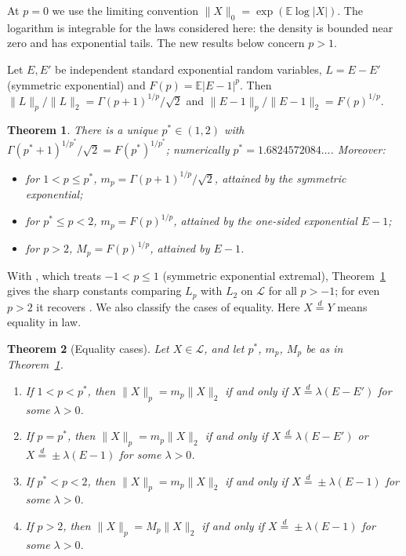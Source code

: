 \documentclass[11pt]{article}
\newtheorem{theorem}{Theorem}
\theoremstyle{remark}
\newcommand{\E}{\mathbb E}
\newcommand{\eqd}{\overset{d}{=}}
\begin{document}
At $p=0$ we use the limiting convention $\|X\|_0=\exp(\E\log|X|)$. The logarithm is integrable for the laws considered here: the density is bounded near zero and has exponential tails. The new results below concern $p>1$.

Let $E,E'$ be independent standard exponential random variables, $L=E-E'$ (symmetric exponential) and $F(p)=\E|E-1|^p$. Then $\|L\|_p/\|L\|_2=\Gamma(p+1)^{1/p}/\sqrt2$ and $\|E-1\|_p/\|E-1\|_2=F(p)^{1/p}$.

\begin{theorem}\label{thm:main}
There is a unique $p^*\in(1,2)$ with $\Gamma(p^*+1)^{1/p^*}/\sqrt2=F(p^*)^{1/p^*}$; numerically $p^*=1.6824572084\ldots$. Moreover:
\begin{itemize}
\item for $1<p\le p^*$, $m_p=\Gamma(p+1)^{1/p}/\sqrt2$, attained by the symmetric exponential;
\item for $p^*\le p<2$, $m_p=F(p)^{1/p}$, attained by the one-sided exponential $E-1$;
\item for $p>2$, $M_p=F(p)^{1/p}$, attained by $E-1$.
\end{itemize}
\end{theorem}

With \cite[Theorem~1]{MRTT}, which treats $-1<p\le1$ (symmetric exponential extremal), Theorem~\ref{thm:main} gives the sharp constants comparing $L_p$ with $L_2$ on $\mathcal L$ for all $p>-1$; for even $p>2$ it recovers \cite[Theorem~1.4]{Eitan}. We also classify the cases of equality. Here $X\eqd Y$ means equality in law.

\begin{theorem}[Equality cases]\label{thm:U}
Let $X\in\mathcal L$, and let $p^*$, $m_p$, $M_p$ be as in Theorem~\ref{thm:main}.
\begin{enumerate}
\item[(i)] If $1<p<p^*$, then $\|X\|_p=m_p\|X\|_2$ if and only if $X\eqd\lambda(E-E')$ for some $\lambda>0$.
\item[(ii)] If $p=p^*$, then $\|X\|_p=m_p\|X\|_2$ if and only if $X\eqd\lambda(E-E')$ or $X\eqd\pm\lambda(E-1)$ for some $\lambda>0$.
\item[(iii)] If $p^*<p<2$, then $\|X\|_p=m_p\|X\|_2$ if and only if $X\eqd\pm\lambda(E-1)$ for some $\lambda>0$.
\item[(iv)] If $p>2$, then $\|X\|_p=M_p\|X\|_2$ if and only if $X\eqd\pm\lambda(E-1)$ for some $\lambda>0$.
\end{enumerate}
\end{theorem}
\end{document}
